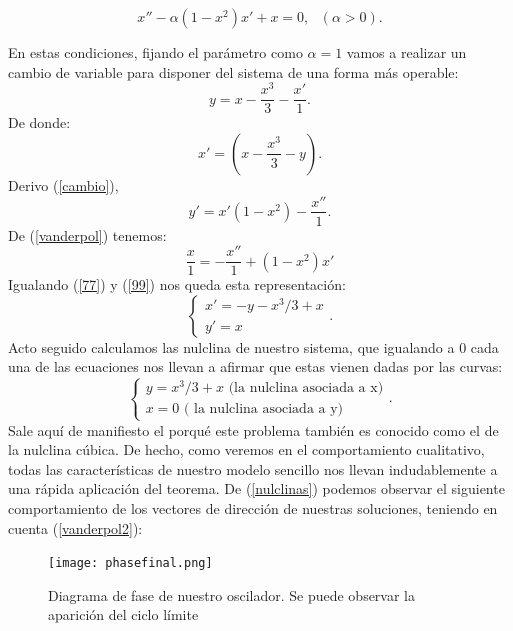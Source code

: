 \begin{equation}
x''-\alpha(1-x^2)x'+x=0,\text{ } (\alpha>0).
\label{vanderpol}
\end{equation}

En estas condiciones, fijando el parámetro como $\alpha=1$ vamos a realizar un cambio de variable para disponer del sistema de una forma más operable:
\begin{equation}
y=x-\frac{x^3}{3}-\frac{x'}{1}.
\label{cambio}
\end{equation}
De donde:
\begin{equation}
x'=(x-\frac{x^3}{3}-y).
\end{equation}
Derivo (\ref{cambio}), 
\begin{equation}
y'=x'(1-x^2)-\frac{x''}{1}.
\label{77}
\end{equation}
De (\ref{vanderpol}) tenemos:
\begin{equation}
\frac{x}{1}=-\frac{x''}{1}+(1-x^2)x'
\label{99}
\end{equation}
Igualando (\ref{77}) y (\ref{99}) nos queda esta representación:
\begin{equation}
 \left \{ \begin{matrix}x'=-y-x^3/3+x  \\y'=x\end{matrix}\right.. 
\label{vanderpol2}
\end{equation}
Acto seguido calculamos las nulclina de nuestro sistema, que igualando a $0$ cada una de las ecuaciones nos llevan a afirmar que estas vienen dadas por las curvas:
\begin{equation}
 \left \{ \begin{matrix}y=x^3/3+x \text{ (la nulclina asociada a x)}  \\x=0 \text{ ( la nulclina asociada a y)}\end{matrix}\right.. 
\label{nulclinas}
\end{equation}
Sale aquí de manifiesto el porqué este problema también es conocido como el de la nulclina cúbica. De hecho, como veremos en el comportamiento cualitativo, todas las características de nuestro modelo sencillo nos llevan indudablemente a una rápida aplicación del teorema.
De (\ref{nulclinas}) podemos observar el siguiente comportamiento de los vectores de dirección de nuestras soluciones, teniendo en cuenta (\ref{vanderpol2}):
\begin{figure}[h]
	\centering
	\texttt{[image: phasefinal.png]}
	\caption{Diagrama de fase de nuestro oscilador. Se puede observar la aparición del ciclo límite  }
\label{poincaa}
\end{figure}
